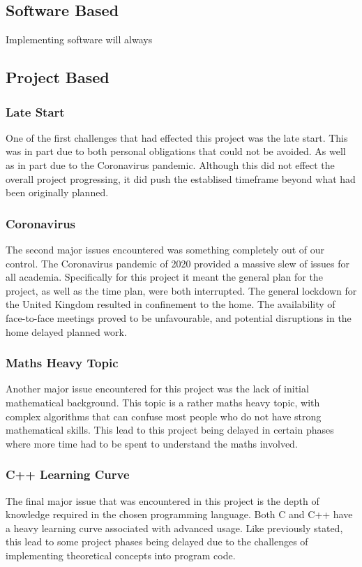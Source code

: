 \documentclass{article}
\begin{document}
\subsection{Software Based}
Implementing software will always 

\subsection{Project Based}
\subsubsection{Late Start}
One of the first challenges that had effected this project was the late start. This was in part due to both personal obligations that could not be avoided. As well as in part due to the Coronavirus pandemic. Although this did not effect the overall project progressing, it did push the establised timeframe beyond what had been originally planned.

\subsubsection{Coronavirus}
The second major issues encountered was something completely out of our control. The Coronavirus
pandemic of 2020 provided a massive slew of issues for all academia. Specifically for this project
it meant the general plan for the project, as well as the time plan, were both interrupted. The
general lockdown for the United Kingdom resulted in confinement to the home. The availability of
face-to-face meetings proved to be unfavourable, and potential disruptions in the home delayed
planned work.

\subsubsection{Maths Heavy Topic}
Another major issue encountered for this project was the lack of initial mathematical background. This topic is a rather maths heavy topic, with complex algorithms that can confuse most people who do not have strong mathematical skills. This lead to this project being delayed in certain phases where more time had to be spent to understand the maths involved.

\subsubsection{C++ Learning Curve}
The final major issue that was encountered in this project is the depth of knowledge required in the chosen programming language. Both C and C++ have a heavy learning curve associated with advanced usage. Like previously stated, this lead to some project phases being delayed due to the challenges of implementing theoretical concepts into program code.
\end{document}
